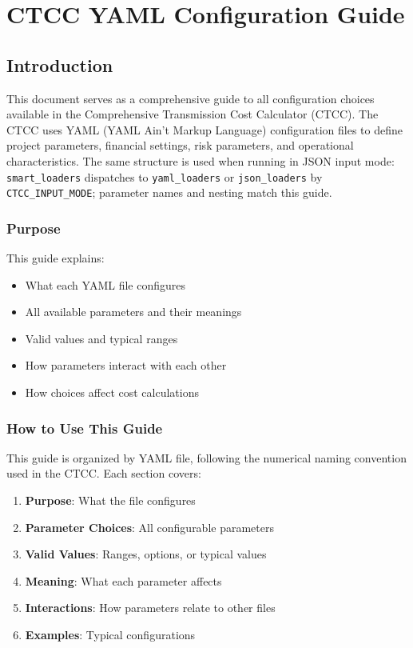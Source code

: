 \documentclass[ctcc_full_documentation.tex]{subfiles}
\begin{document}
\chapter{CTCC YAML Configuration Guide}

\section{Introduction}

This document serves as a comprehensive guide to all configuration choices available in the Comprehensive Transmission Cost Calculator (CTCC). The CTCC uses YAML (YAML Ain't Markup Language) configuration files to define project parameters, financial settings, risk parameters, and operational characteristics. The same structure is used when running in JSON input mode: \texttt{smart\_loaders} dispatches to \texttt{yaml\_loaders} or \texttt{json\_loaders} by \texttt{CTCC\_INPUT\_MODE}; parameter names and nesting match this guide.

\subsection{Purpose}

This guide explains:
\begin{itemize}
    \item What each YAML file configures
    \item All available parameters and their meanings
    \item Valid values and typical ranges
    \item How parameters interact with each other
    \item How choices affect cost calculations
\end{itemize}

\subsection{How to Use This Guide}

This guide is organized by YAML file, following the numerical naming convention used in the CTCC. Each section covers:
\begin{enumerate}
    \item \textbf{Purpose}: What the file configures
    \item \textbf{Parameter Choices}: All configurable parameters
    \item \textbf{Valid Values}: Ranges, options, or typical values
    \item \textbf{Meaning}: What each parameter affects
    \item \textbf{Interactions}: How parameters relate to other files
    \item \textbf{Examples}: Typical configurations
\end{enumerate}
\end{document}
